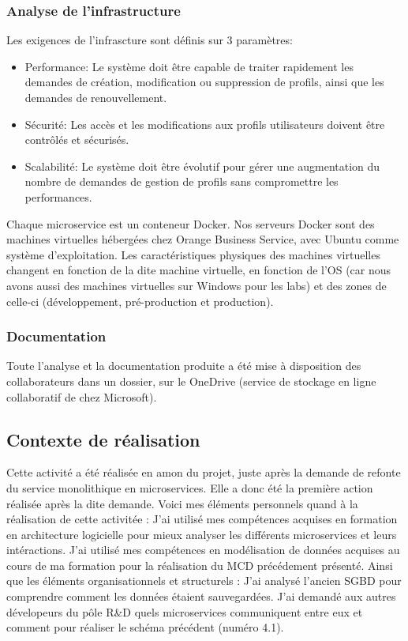 \documentclass[a4paper, 11pt]{report}
\begin{document}
\subsubsection{Analyse de l'infrastructure}
Les exigences de l'infrascture sont définis sur 3 paramètres:
\begin{itemize}
  \item Performance: Le système doit être capable de traiter rapidement les demandes de création, modification ou suppression de profils, ainsi que les demandes de renouvellement.
  \item Sécurité: Les accès et les modifications aux profils utilisateurs doivent être contrôlés et sécurisés.
  \item Scalabilité: Le système doit être évolutif pour gérer une augmentation du nombre de demandes de gestion de profils sans compromettre les performances.
\end{itemize}
\newline
\newline
Chaque microservice est un conteneur Docker.
Nos serveurs Docker sont des machines virtuelles hébergées chez Orange Business Service, avec Ubuntu comme système d'exploitation.
Les caractéristiques physiques des machines virtuelles changent en fonction de la dite machine virtuelle, en fonction de l'OS (car nous avons aussi des machines virtuelles sur Windows pour les labs) et des zones de celle-ci (développement, pré-production et production).
\subsubsection{Documentation}
Toute l'analyse et la documentation produite a été mise à disposition des collaborateurs dans un dossier, sur le OneDrive (service de stockage en ligne collaboratif de chez Microsoft).
\subsection{Contexte de réalisation}
Cette activité a été réalisée en amon du projet, juste après la demande de refonte du service monolithique en microservices. Elle a donc été la première action réalisée après la dite demande.
\newline
\newline
Voici mes  éléments personnels quand à la réalisation de cette activitée :
\newline
J'ai utilisé mes compétences acquises en formation en architecture logicielle pour mieux analyser les différents microservices et leurs intéractions.
\newline
J'ai utilisé mes compétences en modélisation de données acquises au cours de ma formation pour la réalisation du MCD précédement présenté.
\newline
\newline
Ainsi que les éléments organisationnels et structurels :
\newline
J'ai analysé l'ancien SGBD pour comprendre comment les données étaient sauvegardées.
\newline
J'ai demandé aux autres dévelopeurs du pôle R&D quels microservices communiquent entre eux et comment pour réaliser le schéma précédent (numéro 4.1).
\end{document}
